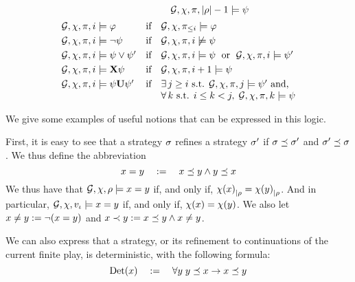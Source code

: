 \begin{definition}
\[\begin{array}{lcl}
  & &\quad   \CGS,\assign,\iplay,|\fplay|-1\modelsSL \psi\\[5pt]
    \CGS,\assign,\iplay,i\modelsSL \phi & \text{if} &
                                                         \CGS,\assign,\iplay_{\leq i}\modelsSL\phi\\[3pt]
   \CGS,\assign,\iplay,i\modelsSL \neg\psi & \text{if} &
  \CGS,\assign,\iplay,i\not\modelsSL\psi\\[3pt]
 \CGS,\assign,\iplay,i\modelsSL \psi\ou\psi' & \text{if} &
  \CGS,\assign,\iplay,i\modelsSL\psi \;\text{ or }\;
  \CGS,\assign,\iplay,i\modelsSL\psi' \\[3pt]
  \CGS,\assign,\iplay,i\modelsSL\X\psi & \text{if} &
  \CGS,\assign,\iplay,i+1\modelsSL\psi\\[3pt]
\CGS,\assign,\iplay,i\modelsSL\psi\until\psi' & \text{if} & \exists\, j\geq i
   \mbox{ s.t. }\CGS,\assign,\iplay,j\modelsSL \psi' \text{ and,}\\ 
   & & \forall\, k \text{ s.t. } i\leq k <j,
\; \CGS,\assign,\iplay,k\modelsSL \psi
\end{array}
\]
\end{definition}


We give some examples of useful notions that can be expressed in this
logic. 

\begin{example}
  First, it is easy to see that a strategy $\sigma$ refines a strategy
  $\sigma'$ if $\sigma \preceq \sigma'$ and
  $\sigma'\preceq\sigma$. We thus define the abbreviation
  \[x = y \quad := \quad x \preceq y \wedge y
    \preceq x\]
  We thus have that $\CGS,\assign,\fplay\models \var = \varb$ if, and
  only if, ${\chi(x)}_{|\rho}={\chi(y)}_{|\rho}$. And in
  particular, $\CGS,\assign,\pos_\init\models\var=\varb$ if, and only
  if, $\chi(x)=\chi(y)$.
  We also let $x \neq y := \neg (x = y)$ and
  $x\prec y := x \preceq y \wedge x \neq y$.
\end{example}

\begin{example}
  We can also express that a strategy, or its refinement to
  continuations of the current finite play, is deterministic, with the
  following formula:
  \[\text{Det}(x) \quad := \quad \forall y \; y \preceq x \to x\preceq y\]
\end{example}

